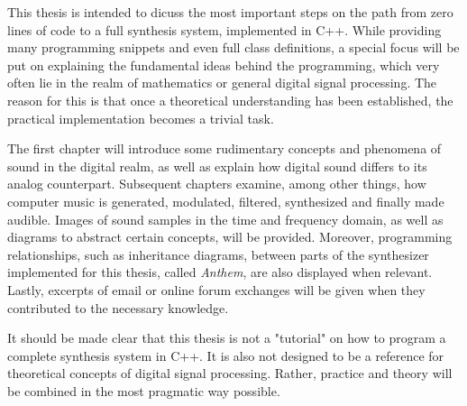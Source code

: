 This thesis is intended to dicuss the most important steps on the path from zero lines of code to a full synthesis system, implemented in C++. While providing many programming snippets and even full class definitions\footnotemark{}, a special focus will be put on explaining the fundamental ideas behind the programming, which very often lie in the realm of mathematics or general digital signal processing. The reason for this is that once a theoretical understanding has been established, the practical implementation becomes a trivial task.\vspace{\baselineskip}


\noindent The first chapter will introduce some rudimentary concepts and phenomena of sound in the digital realm, as well as explain how digital sound differs to its analog counterpart. Subsequent chapters examine, among other things, how computer music is generated, modulated, filtered, synthesized and finally made audible. Images of sound samples in the time and frequency domain, as well as diagrams to abstract certain concepts, will be provided. Moreover, programming relationships, such as inheritance diagrams, between parts of the synthesizer implemented for this thesis, called \emph{Anthem}, are also displayed when relevant. Lastly, excerpts of email or online forum exchanges will be given when they contributed to the necessary knowledge. \vspace{\baselineskip}

It should be made clear that this thesis is not a "tutorial" on how to program a complete synthesis system in C++. It is also not designed to be a reference for theoretical concepts of digital signal processing. Rather, practice and theory will be combined in the most pragmatic way possible.
